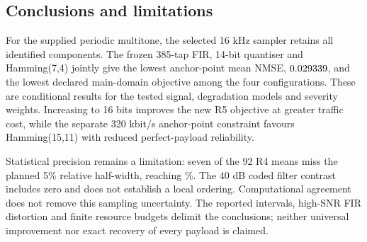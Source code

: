 \FloatBarrier
\begin{samepage}
\section*{Conclusions and limitations}
{}
\label{sec:conclusions}
For the supplied periodic multitone, the selected 16 kHz sampler retains
all identified components. The frozen 385-tap FIR, 14-bit quantiser and
Hamming(7,4) jointly give the lowest anchor-point mean NMSE,
$0.029339$, and the lowest declared main-domain objective among
the four configurations. These are conditional results for the tested
signal, degradation models and severity weights. Increasing to 16 bits
improves the new R5 objective at greater traffic cost, while the separate
320 kbit/s anchor-point constraint favours Hamming(15,11) with reduced
perfect-payload reliability.

Statistical precision remains a limitation: seven of the 92 R4 means
miss the planned 5\% relative half-width, reaching \WMaxRelativePercent\%.
The 40 dB coded filter contrast includes zero and does not establish a
local ordering. Computational agreement does not remove this sampling
uncertainty. The reported intervals, high-SNR FIR distortion and finite
resource budgets delimit the conclusions; neither universal improvement
nor exact recovery of every payload is claimed.
\end{samepage}
